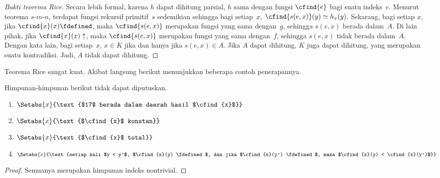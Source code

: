 \documentclass[../../../include/open-logic-section]{subfiles}
\begin{document}
\begin{proof}[Bukti teorema Rice]
Secara lebih formal, karena $h$ dapat dihitung parsial, $h$ sama dengan fungsi
$\cfind{e}$ bagi suatu indeks~$e$. Menurut teorema $s$-$m$-$n$, terdapat
fungsi rekursif primitif~$s$ sedemikian sehingga bagi setiap~$x$,
$\cfind{s(e,x)}(y)\simeq h_x(y)$. Sekarang, bagi setiap $x$, jika
$\cfind{x}(x) \fdefined$, maka $\cfind{s(e,x)}$ merupakan fungsi yang sama
dengan~$g$, sehingga $s(e,x)$ berada dalam~$A$. Di lain pihak, jika
$\cfind{x}(x) \uparrow$, maka $\cfind{s(e,x)}$ merupakan fungsi yang sama
dengan~$f$, sehingga $s(e,x)$ tidak berada dalam~$A$. Dengan kata lain, bagi
setiap~$x$, $x \in K$ jika dan hanya jika $s(e,x) \in A$. Jika $A$ dapat
dihitung, $K$ juga dapat dihitung, yang merupakan suatu kontradiksi. Jadi,
$A$ tidak dapat dihitung.
\end{proof}

Teorema Rice sangat kuat. Akibat langsung berikut menunjukkan beberapa
contoh penerapannya.
\begin{cor}
Himpunan-himpunan berikut tidak dapat diputuskan.
\begin{enumerate}
\item $\Setabs{x}{\text{$17$ berada dalam daerah hasil $\cfind{x}$}}$
\item $\Setabs{x}{\text{$\cfind{x}$ konstan}}$
\item $\Setabs{x}{\text{$\cfind{x}$ total}}$
\item $\Setabs{x}{\text{setiap kali $y < y'$, $\cfind{x}(y) \fdefined$, dan
    jika $\cfind{x}(y') \fdefined$, maka $\cfind{x}(y) < \cfind{x}(y')$}}$
\end{enumerate}
\end{cor}

\begin{proof}
  Semuanya merupakan himpunan indeks nontrivial.
\end{proof}
\end{document}
